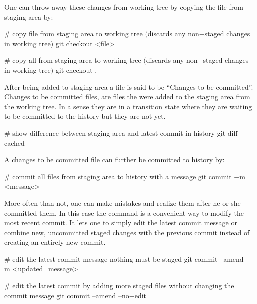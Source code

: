 One can throw away these changes from working tree by copying the file from staging area by:

\begin{bash}
# copy file from staging area to working tree $($discards any non$-$staged changes in working tree$)$
git checkout <file>
\end{bash}


\begin{bash}
# copy all from staging area to working tree $($discards any non$-$staged changes in working tree$)$
git checkout .
\end{bash}

After being added to staging area a file is said to be ``Changes to be committed''. Changes to be committed files,
are files the were added to the staging area from the working tree. In a sense they are in a transition state where
they are waiting to be committed to the history but they are not yet.

\begin{bash}
# show difference between staging area and latest commit in history
git diff --cached
\end{bash}

A changes to be committed file can further be committed to history by:

\begin{bash}
# commit all files from staging area to history with a message
git commit $-$m <message>
\end{bash}


More often than not, one can make mistakes and realize them after he or she committed them. In this case the
 command is a convenient way to modify the most recent commit. It lets one to simply edit
the latest commit message or combine new, uncommitted staged changes with the previous commit instead of creating an
entirely new commit.

\begin{bash}
# edit the latest commit message nothing must be staged
git commit --amend $-$m <updated_message>
\end{bash}

\begin{bash}
# edit the latest commit by adding more staged files without changing the commit message
git commit --amend --no$-$edit
\end{bash}

